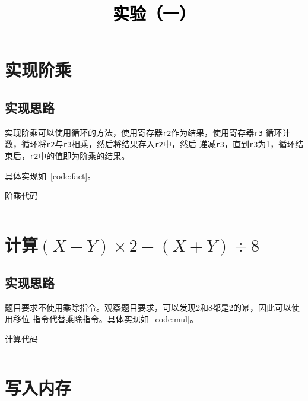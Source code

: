\documentclass[a4paper,twoside]{article}
\newcommand{\PaperTitle}{实验（一）}  %
\begin{document}
\newpage

\title{
	\Large{\textcolor{black}{\PaperTitle}}
}
	
	
\maketitle
	
\tableofcontents
 
\newpage
\setcounter{page}{1}

\begin{spacing}{1.2}

\section{实现阶乘}

\subsection{实现思路}

实现阶乘可以使用循环的方法，使用寄存器\texttt{r2}作为结果，使用寄存器\texttt{r3}
循环计数，循环将\texttt{r2}与\texttt{r3}相乘，然后将结果存入\texttt{r2}中，然后
递减\texttt{r3}，直到\texttt{r3}为1，循环结束后，\texttt{r2}中的值即为阶乘的结果。

具体实现如~\ref{code:fact}。

\begin{listing}[htb]
	\caption{阶乘代码}
	\label{code:fact}
	\inputminted{nasm}{code/fact.txt}
\end{listing}

\section{计算$(X-Y) \times 2 - (X+Y)\div 8$}

\subsection{实现思路}

题目要求不使用乘除指令。观察题目要求，可以发现2和8都是2的幂，因此可以使用移位
指令代替乘除指令。具体实现如~\ref{code:mul}。

\begin{listing}[htb]
	\caption{计算代码}
	\label{code:mul}
	\inputminted{nasm}{code/mul.txt}
\end{listing}

\section{写入内存}


\end{spacing}
\end{document}
